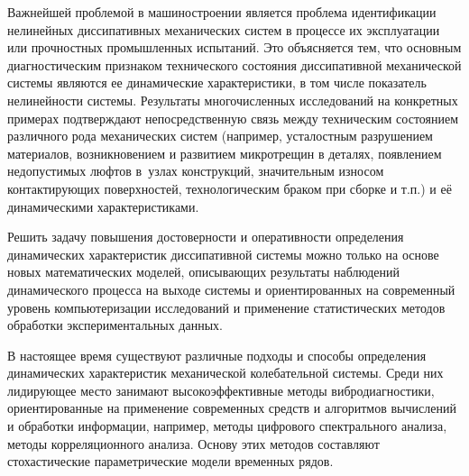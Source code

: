 \smallskip

{
\small
Важнейшей проблемой в машиностроении является проблема идентификации нелинейных диссипативных механических систем в процессе их эксплуатации или прочностных промышленных испытаний. 
Это объясняется тем, что основным диагностическим признаком технического состояния диссипативной механической системы являются ее динамические характеристики, в том числе показатель нелинейности системы. 
Результаты многочисленных исследований на конкретных примерах подтверждают непосредственную связь между техническим состоянием различного рода механических систем (например, усталостным разрушением материалов, возникновением и развитием микротрещин в деталях, появлением недопустимых люфтов в~узлах конструкций, значительным износом контактирующих поверхностей, технологическим браком при сборке и т.п.) и её динамическими характеристиками.

Решить задачу повышения достоверности и оперативности определения динамических характеристик диссипативной системы можно только на основе новых математических моделей,  описывающих результаты наблюдений динамического процесса на выходе системы и ориентированных на современный уровень компьютеризации исследований и применение статистических методов обработки экспериментальных данных.
%

В настоящее время существуют различные подходы и способы определения динамических характеристик механической колебательной системы. Среди них лидирующее место занимают высокоэффективные методы вибродиагностики, ориентированные на применение современных средств и алгоритмов вычислений и обработки информации, например, методы цифрового спектрального анализа, методы корреляционного анализа. Основу этих методов составляют стохастические параметрические модели временных рядов. 

}
